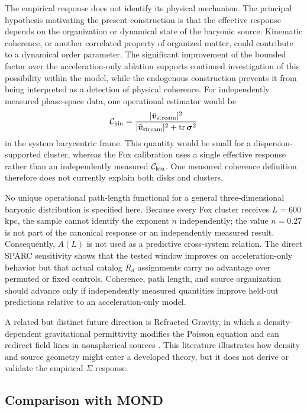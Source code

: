 \documentclass[aps,prd,reprint,superscriptaddress,showpacs,floatfix,longbibliography]{revtex4-2}
\begin{document}
The empirical response does not identify its physical mechanism. The principal hypothesis motivating the present construction is that the effective response depends on the organization or dynamical state of the baryonic source. Kinematic coherence, or another correlated property of organized matter, could contribute to a dynamical order parameter. The significant improvement of the bounded factor over the acceleration-only ablation supports continued investigation of this possibility within the model, while the endogenous construction prevents it from being interpreted as a detection of physical coherence. For independently measured phase-space data, one operational estimator would be
\begin{equation}
\mathcal C_{\rm kin}=
\frac{|\bar{\bm v}_{\rm stream}|^2}
{|\bar{\bm v}_{\rm stream}|^2+
{\rm tr}\,\bm{\sigma}^2}
\label{eq:ckin}
\end{equation}
in the system barycentric frame. This quantity would be small for a dispersion-supported cluster, whereas the Fox calibration uses a single effective response rather than an independently measured $\mathcal C_{\rm kin}$. One measured coherence definition therefore does not currently explain both disks and clusters.

No unique operational path-length functional for a general three-dimensional baryonic distribution is specified here. Because every Fox cluster receives $L=600$ kpc, the sample cannot identify the exponent $n$ independently; the value $n=0.27$ is not part of the canonical response or an independently measured result. Consequently, $A(L)$ is not used as a predictive cross-system relation. The direct SPARC sensitivity shows that the tested window improves on acceleration-only behavior but that actual catalog $R_d$ assignments carry no advantage over permuted or fixed controls. Coherence, path length, and source organization should advance only if independently measured quantities improve held-out predictions relative to an acceleration-only model.

A related but distinct future direction is Refracted Gravity, in which a density-dependent gravitational permittivity modifies the Poisson equation and can redirect field lines in nonspherical sources \cite{ref12,ref13,ref14}. This literature illustrates how density and source geometry might enter a developed theory, but it does not derive or validate the empirical $\Sigma$ response.

\subsection{Comparison with MOND}
\end{document}
